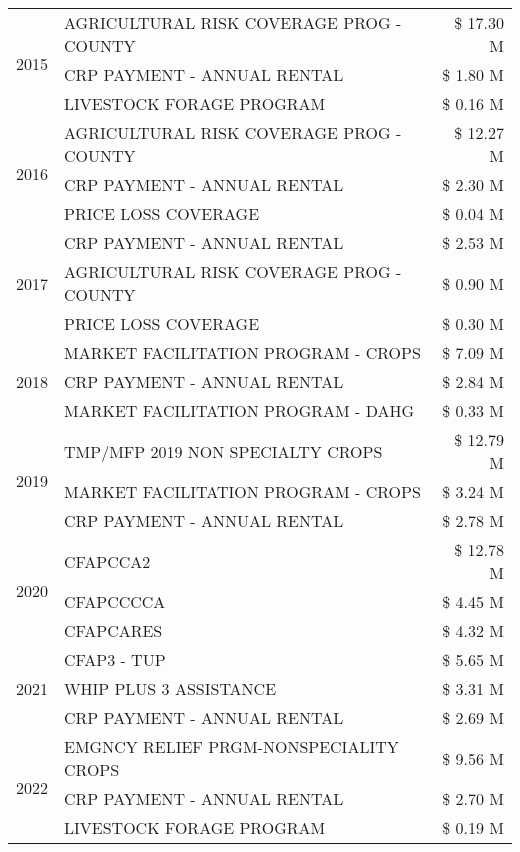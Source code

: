 \begin{tabular}{llr}
\multirow[t]{3}{*}{2015} & AGRICULTURAL RISK COVERAGE PROG - COUNTY & \$ 17.30 M \\
 & CRP PAYMENT - ANNUAL RENTAL & \$ 1.80 M \\
 & LIVESTOCK FORAGE PROGRAM & \$ 0.16 M \\
\cline{1-3}
\multirow[t]{3}{*}{2016} & AGRICULTURAL RISK COVERAGE PROG - COUNTY & \$ 12.27 M \\
 & CRP PAYMENT - ANNUAL RENTAL & \$ 2.30 M \\
 & PRICE LOSS COVERAGE & \$ 0.04 M \\
\cline{1-3}
\multirow[t]{3}{*}{2017} & CRP PAYMENT - ANNUAL RENTAL & \$ 2.53 M \\
 & AGRICULTURAL RISK COVERAGE PROG - COUNTY & \$ 0.90 M \\
 & PRICE LOSS COVERAGE & \$ 0.30 M \\
\cline{1-3}
\multirow[t]{3}{*}{2018} & MARKET FACILITATION PROGRAM - CROPS & \$ 7.09 M \\
 & CRP PAYMENT - ANNUAL RENTAL & \$ 2.84 M \\
 & MARKET FACILITATION PROGRAM - DAHG & \$ 0.33 M \\
\cline{1-3}
\multirow[t]{3}{*}{2019} & TMP/MFP 2019 NON SPECIALTY CROPS & \$ 12.79 M \\
 & MARKET FACILITATION PROGRAM - CROPS & \$ 3.24 M \\
 & CRP PAYMENT - ANNUAL RENTAL & \$ 2.78 M \\
\cline{1-3}
\multirow[t]{3}{*}{2020} & CFAPCCA2 & \$ 12.78 M \\
 & CFAPCCCCA & \$ 4.45 M \\
 & CFAPCARES & \$ 4.32 M \\
\cline{1-3}
\multirow[t]{3}{*}{2021} & CFAP3 - TUP & \$ 5.65 M \\
 & WHIP PLUS 3 ASSISTANCE & \$ 3.31 M \\
 & CRP PAYMENT - ANNUAL RENTAL & \$ 2.69 M \\
\cline{1-3}
\multirow[t]{3}{*}{2022} & EMGNCY RELIEF PRGM-NONSPECIALITY CROPS & \$ 9.56 M \\
 & CRP PAYMENT - ANNUAL RENTAL & \$ 2.70 M \\
 & LIVESTOCK FORAGE PROGRAM & \$ 0.19 M \\
\cline{1-3}
\bottomrule
\end{tabular}
